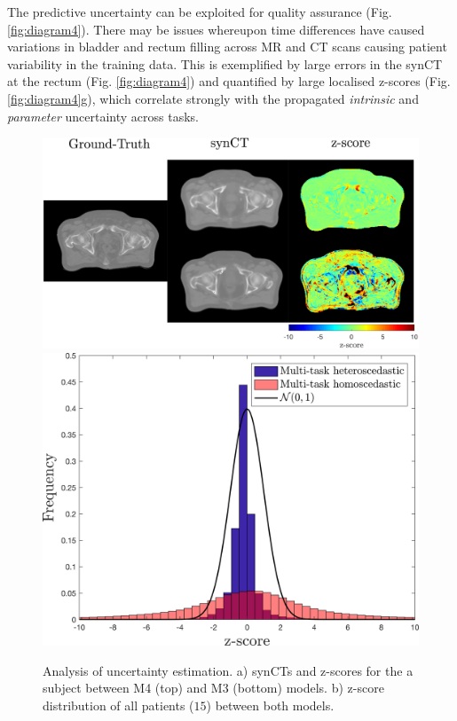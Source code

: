 The predictive uncertainty can be exploited for quality assurance (Fig. \ref{fig:diagram4}). There may be issues whereupon time differences have caused variations in bladder and rectum filling across MR and CT scans causing patient variability in the training data. This is exemplified by large errors in the synCT at the rectum (Fig. \ref{fig:diagram4}) and quantified by large localised z-scores (Fig. \ref{fig:diagram4}g), which correlate strongly with the propagated \emph{intrinsic} and \emph{parameter} uncertainty across tasks.

\begin{figure}[!t]
	\centering
	{\includegraphics[trim=0mm 0mm 0mm 0mm,clip=true,height=0.29\textwidth,keepaspectratio]{chapter_5/figures/new_fig_z_1.pdf}}
	\hspace{0.01\textwidth}
	{\includegraphics[trim=0mm 0mm 0mm 0mm,clip=true,height=0.29\textwidth,keepaspectratio]{chapter_5/figures/fig_z_2.png}}
	\caption{\footnotesize Analysis of uncertainty estimation. a) synCTs and z-scores for the a subject between M4 (top) and M3 (bottom) models. b) z-score distribution of all patients ($15$) between both models.}
	\label{fig:diag3}
\end{figure}


